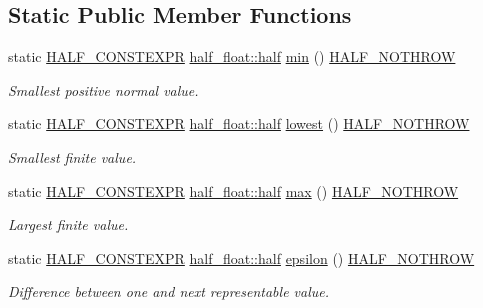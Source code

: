 \subsection*{Static Public Member Functions}
\begin{DoxyCompactItemize}
\item 
static \hyperlink{half_8hpp_ace3116a3e2cd66dd15780b92060987c7}{H\+A\+L\+F\+\_\+\+C\+O\+N\+S\+T\+E\+X\+PR} \hyperlink{classhalf__float_1_1half}{half\+\_\+float\+::half} \hyperlink{classstd_1_1numeric__limits_3_01half__float_1_1half_01_4_a52dd448e009c0a1a7e463c773cbd8f9e}{min} () \hyperlink{half_8hpp_a76353b496550acb4b523ad263d09908a}{H\+A\+L\+F\+\_\+\+N\+O\+T\+H\+R\+OW}
\begin{DoxyCompactList}\small\item\em Smallest positive normal value. \end{DoxyCompactList}\item 
static \hyperlink{half_8hpp_ace3116a3e2cd66dd15780b92060987c7}{H\+A\+L\+F\+\_\+\+C\+O\+N\+S\+T\+E\+X\+PR} \hyperlink{classhalf__float_1_1half}{half\+\_\+float\+::half} \hyperlink{classstd_1_1numeric__limits_3_01half__float_1_1half_01_4_abe8e9622711ffafb029c35b349d18af4}{lowest} () \hyperlink{half_8hpp_a76353b496550acb4b523ad263d09908a}{H\+A\+L\+F\+\_\+\+N\+O\+T\+H\+R\+OW}
\begin{DoxyCompactList}\small\item\em Smallest finite value. \end{DoxyCompactList}\item 
static \hyperlink{half_8hpp_ace3116a3e2cd66dd15780b92060987c7}{H\+A\+L\+F\+\_\+\+C\+O\+N\+S\+T\+E\+X\+PR} \hyperlink{classhalf__float_1_1half}{half\+\_\+float\+::half} \hyperlink{classstd_1_1numeric__limits_3_01half__float_1_1half_01_4_a18dff56a912af3306b967a49a7a1a859}{max} () \hyperlink{half_8hpp_a76353b496550acb4b523ad263d09908a}{H\+A\+L\+F\+\_\+\+N\+O\+T\+H\+R\+OW}
\begin{DoxyCompactList}\small\item\em Largest finite value. \end{DoxyCompactList}\item 
static \hyperlink{half_8hpp_ace3116a3e2cd66dd15780b92060987c7}{H\+A\+L\+F\+\_\+\+C\+O\+N\+S\+T\+E\+X\+PR} \hyperlink{classhalf__float_1_1half}{half\+\_\+float\+::half} \hyperlink{classstd_1_1numeric__limits_3_01half__float_1_1half_01_4_ab0a429948d6c6be91abbd36f4d73eb08}{epsilon} () \hyperlink{half_8hpp_a76353b496550acb4b523ad263d09908a}{H\+A\+L\+F\+\_\+\+N\+O\+T\+H\+R\+OW}
\begin{DoxyCompactList}\small\item\em Difference between one and next representable value. \end{DoxyCompactList}\item 

\end{DoxyCompactItemize}

